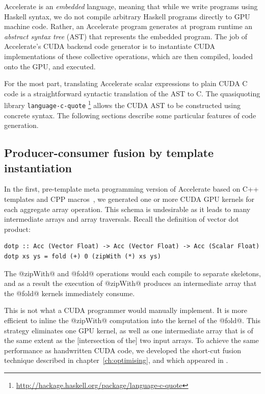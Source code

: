 Accelerate is an \emph{embedded} language, meaning that while we write programs
using Haskell syntax, we do not compile arbitrary Haskell programs directly to
GPU machine code. Rather, an Accelerate program generates at program runtime an
\emph{abstract syntax tree} (AST) that
represents the embedded program.
The job of Accelerate's CUDA backend code generator is to instantiate CUDA
implementations of these collective operations, which are then compiled, loaded
onto the GPU, and executed.

For the most part, translating Accelerate scalar expressions to plain CUDA C
code is a straightforward syntactic translation of the  AST
to C\@. The quasiquoting library \texttt{language-c-quote}%
\footnote{\url{http://hackage.haskell.org/package/language-c-quote}} allows the
CUDA AST to be constructed using concrete syntax. The following sections
describe some particular features of code generation.



\subsection{Producer-consumer fusion by template instantiation}
\label{sec:fusion_by_template_instantiation}

In the first, pre-template meta programming version of Accelerate based on C++
templates and CPP macros~\cite{Chakravarty:2011fr}, we generated one or more
CUDA GPU kernels for each aggregate array operation. This schema is undesirable
as it leads to many intermediate arrays and array traversals. Recall the
definition of vector dot product:
%
\begin{lstlisting}[style=haskell]
dotp :: Acc (Vector Float) -> Acc (Vector Float) -> Acc (Scalar Float)
dotp xs ys = fold (+) 0 (zipWith (*) xs ys)
\end{lstlisting}
%
The @zipWith@ and @fold@ operations would each compile to separate
skeletons, and as a result the execution of @zipWith@ produces an
intermediate array that the @fold@ kernels immediately consume.

This is not what a CUDA programmer would manually implement. It is more
efficient to inline the @zipWith@ computation into the kernel of the
@fold@. This strategy eliminates one GPU kernel, as well as one
intermediate array that is of the same extent as the [intersection of the] two
input arrays. To achieve the same performance as handwritten CUDA code, we
developed the short-cut fusion technique described in
chapter~\ref{ch:optimising}, and which appeared in \cite{McDonell:2013wi}.

